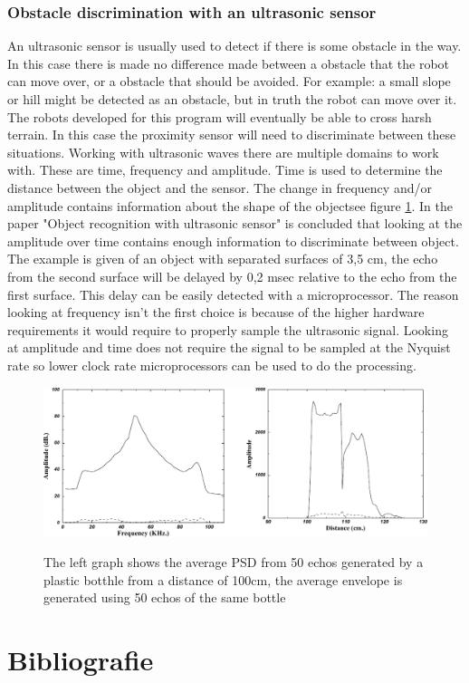\documentclass[10pt,a4paper]{article}
\begin{document}
\subsubsection{Obstacle discrimination with an ultrasonic sensor}
An ultrasonic sensor is usually used to detect if there is some obstacle in the way. In this case there is made no difference made between a obstacle that the robot can move over, or a obstacle that should be avoided. For example: a small slope or hill might be detected as an obstacle, but in truth the robot can move over it. The robots developed for this program will eventually be able to cross harsh terrain. In this case the proximity sensor will need to discriminate between these situations. Working with ultrasonic waves there are multiple domains to work with. These are time, frequency and amplitude. Time is used to determine the distance between the object and the sensor. The change in frequency and/or amplitude contains information about the shape of the object\cite{ultraobject}see figure \ref{ultrafreq}. In the paper "Object recognition with ultrasonic sensor" is concluded that looking at the amplitude over time contains enough information to discriminate between object\cite{ultraobject}. The example is given of an object with separated surfaces of 3,5 cm, the echo from the second surface will be delayed by 0,2 msec relative to the echo from the first surface. This delay can be easily detected with a microprocessor. The reason looking at frequency isn't the first choice is because of the higher hardware requirements it would require to properly sample the ultrasonic signal. Looking at amplitude and time does not require the signal to be sampled at the Nyquist rate so lower clock rate microprocessors can be used to do the processing.
\\
\begin{figure}[h]

  \centering
      \includegraphics[width=1\textwidth]{ultrafreq.pdf}
  \caption{The left graph shows the average PSD from 50 echos generated by a plastic botthle from a distance of 100cm, the average envelope is generated using 50 echos of the same bottle} \cite{ultraobject}  \label{ultrafreq}
 
\end{figure}


\newpage

\section{Bibliografie}


\end{document}
